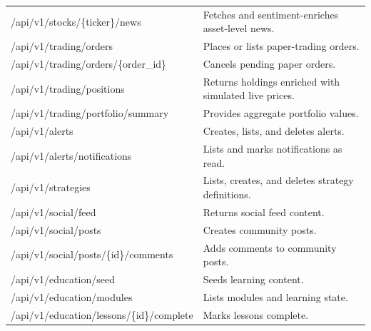 \documentclass[11pt,a4paper]{article}
\begin{document}
\begin{longtable}{p{} p{}}
/api/v1/stocks/\{ticker\}/news & Fetches and sentiment-enriches asset-level news. \\
/api/v1/trading/orders & Places or lists paper-trading orders. \\
/api/v1/trading/orders/\{order\_id\} & Cancels pending paper orders. \\
/api/v1/trading/positions & Returns holdings enriched with simulated live prices. \\
/api/v1/trading/portfolio/summary & Provides aggregate portfolio values. \\
/api/v1/alerts & Creates, lists, and deletes alerts. \\
/api/v1/alerts/notifications & Lists and marks notifications as read. \\
/api/v1/strategies & Lists, creates, and deletes strategy definitions. \\
/api/v1/social/feed & Returns social feed content. \\
/api/v1/social/posts & Creates community posts. \\
/api/v1/social/posts/\{id\}/comments & Adds comments to community posts. \\
/api/v1/education/seed & Seeds learning content. \\
/api/v1/education/modules & Lists modules and learning state. \\
/api/v1/education/lessons/\{id\}/complete & Marks lessons complete. \\
\end{longtable}
\end{document}
